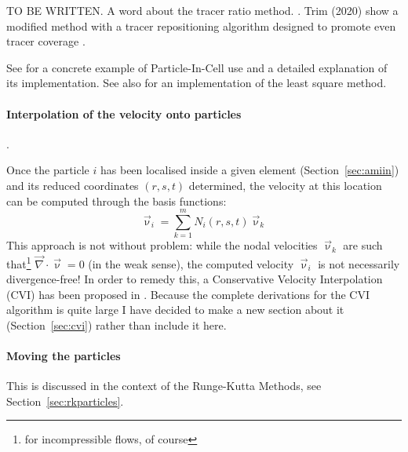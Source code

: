 \begin{remark}
TO BE WRITTEN.
A word about the tracer ratio method. \cite{taki03}. 
Trim \etal (2020) show a modified method 
with a tracer repositioning algorithm designed to promote even tracer
coverage \cite{trlb20}. 
\end{remark}



See  for a concrete example of Particle-In-Cell use and a detailed 
explanation of its implementation. See also  for an implementation of the 
least square method. 



\paragraph{Interpolation of the velocity onto particles}.

Once the particle $i$ has been localised inside a given element (Section~\ref{sec:amiin}) 
and its reduced coordinates $(r,s,t)$ determined, the velocity at this location can 
be computed through the basis functions:
\[
\vec\upnu_i=\sum_{k=1}^m N_i(r,s,t) \vec\upnu_k
\]
This approach is not without problem: while the nodal velocities $\vec\upnu_k$ are such 
that\footnote{for incompressible flows, of course} 
$\vec\nabla\cdot\vec\upnu=0$ (in the weak sense), the computed velocity $\vec\upnu_i$ 
is not necessarily divergence-free! In order to remedy this, a 
Conservative Velocity Interpolation (CVI) has been proposed in \cite{waav15}.
Because the complete derivations for the CVI algorithm is quite large I 
have decided to make a new section about it (Section~\ref{sec:cvi}) rather than include it 
here.

\paragraph{Moving the particles}

This is discussed in the context of the Runge-Kutta Methods, see Section~\ref{sec:rkparticles}.











